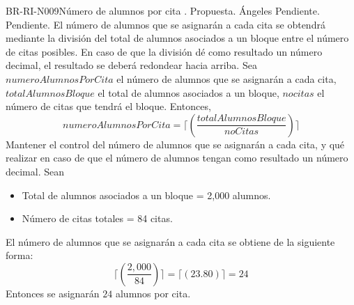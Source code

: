 \begin{BusinessRule}{BR-RI-N009}{Número de alumnos por cita}
	{\bcDerivation}    %
	{\btTimer}   %
	{\blControlling}    %
	.
	\BRItem[Estado] Propuesta.
	 Ángeles
	 Pendiente.
	 Pendiente.
	\BRItem[Descripción] El número de alumnos que se asignarán a cada cita se obtendrá mediante la división del total de alumnos asociados a un bloque entre el número de citas posibles. En caso de que la división dé como resultado un número decimal, el resultado se deberá redondear hacia arriba.
	\BRItem[Sentencia] \cdtEmpty	
	Sea $numeroAlumnosPorCita$ el número de alumnos que se asignarán a cada cita, $totalAlumnosBloque$ el total de alumnos asociados a un bloque, $nocitas$ el número de citas que tendrá el bloque. Entonces,
	$$numeroAlumnosPorCita=\lceil (\frac{totalAlumnosBloque}{noCitas} ) \rceil $$
	\BRItem[Motivación] Mantener el control del número de alumnos que se asignarán a cada cita, y qué realizar en caso de que el número de alumnos tengan como resultado un número decimal.
	\BRItem[Ejemplo]
	Sean 
	\begin{itemize}
		\item Total de alumnos asociados a un bloque = 2,000 alumnos.
		\item Número de citas totales =  84 citas.
	\end{itemize}
	El número de alumnos que se asignarán a cada cita se obtiene de la siguiente forma:
		$$\lceil (\frac{2,000}{84} ) \rceil = \lceil ( 23.80 ) \rceil = 24$$ 
	Entonces se asignarán $24$ alumnos por cita.
\end{BusinessRule}


